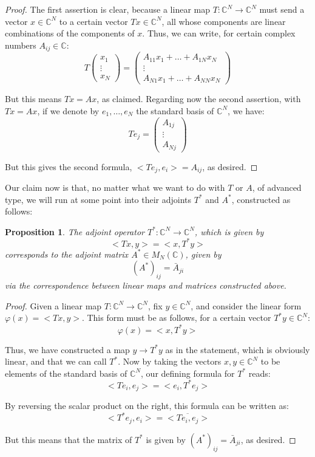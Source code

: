 \documentclass[12pt]{amsbook}
\newtheorem{proposition}[theorem]{Proposition}
\begin{document}
\begin{proof}
The first assertion is clear, because a linear map $T:\mathbb C^N\to\mathbb C^N$ must send a vector $x\in\mathbb C^N$ to a certain vector $Tx\in\mathbb C^N$, all whose components are linear combinations of the components of $x$. Thus, we can write, for certain complex numbers $A_{ij}\in\mathbb C$:
$$T\begin{pmatrix}
x_1\\
\vdots\\
x_N
\end{pmatrix}
=\begin{pmatrix}
A_{11}x_1+\ldots+A_{1N}x_N\\
\vdots\\
A_{N1}x_1+\ldots+A_{NN}x_N
\end{pmatrix}$$

But this means $Tx=Ax$, as claimed. Regarding now the second assertion, with $Tx=Ax$, if we denote by $e_1,\ldots,e_N$ the standard basis of $\mathbb C^N$, we have:
$$Te_j
=\begin{pmatrix}
A_{1j}\\
\vdots\\
A_{Nj}
\end{pmatrix}$$

But this gives the second formula, $<Te_j,e_i>=A_{ij}$, as desired.
\end{proof}

Our claim now is that, no matter what we want to do with $T$ or $A$, of advanced type, we will run at some point into their adjoints $T^*$ and $A^*$, constructed as follows:


\begin{proposition}
The adjoint operator $T^*:\mathbb C^N\to\mathbb C^N$, which is given by
$$<Tx,y>=<x,T^*y>$$
corresponds to the adjoint matrix $A^*\in M_N(\mathbb C)$, given by
$$(A^*)_{ij}=\bar{A}_{ji}$$
via the correspondence between linear maps and matrices constructed above.
\end{proposition}

\begin{proof}
Given a linear map $T:\mathbb C^N\to\mathbb C^N$, fix $y\in\mathbb C^N$, and consider the linear form $\varphi(x)=<Tx,y>$. This form must be as follows, for a certain vector $T^*y\in\mathbb C^N$:
$$\varphi(x)=<x,T^*y>$$

Thus, we have constructed a map $y\to T^*y$ as in the statement, which is obviously linear, and that we can call $T^*$. Now by taking the vectors $x,y\in\mathbb C^N$ to be elements of the standard basis of $\mathbb C^N$, our defining formula for $T^*$ reads:
$$<Te_i,e_j>=<e_i,T^*e_j>$$

By reversing the scalar product on the right, this formula can be written as:
$$<T^*e_j,e_i>=\overline{<Te_i,e_j>}$$

But this means that the matrix of $T^*$ is given by $(A^*)_{ij}=\bar{A}_{ji}$, as desired.
\end{proof}
\end{document}
